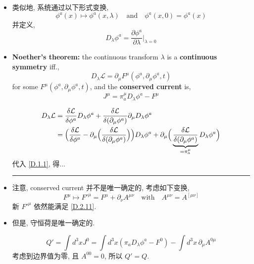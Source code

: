 \begin{itemize}
	\item 类似地, 系统通过以下形式变换,
	\begin{equation}
		\phi^a(x) \mapsto \phi^a(x, \lambda) \quad \text{and} \quad \phi^a(x, 0) = \phi^a(x)
	\end{equation}
	并定义,
	\begin{equation}
		D_\lambda \phi^a = \frac{\partial \phi^a}{\partial \lambda} \Big|_{\lambda = 0}
	\end{equation}
	
	\item \textbf{Noether's theorem:} the continuous transform $\lambda$ is a \textbf{continuous symmetry} iff.,
	\begin{equation} \label{D.2.11}
		D_\lambda \mathcal{L} = \partial_\mu F^\mu(\phi^a, \partial_\mu \phi^a, t)
	\end{equation}
	for some $F^\mu(\phi^a, \partial_\mu \phi^a, t)$, and the \textbf{conserved current} is,
	\begin{equation} \label{D.2.12}
		J^\mu = \pi_a^\mu D_\lambda \phi^a - F^\mu
	\end{equation}
	
	\begin{tcolorbox}[title=proof:]
		\begin{align}
			D_\lambda \mathcal{L} &= \frac{\delta \mathcal{L}}{\delta \phi^a} D_\lambda \phi^a + \frac{\delta \mathcal{L}}{\delta (\partial_\mu \phi^a)} \partial_\mu D_\lambda \phi^a \notag \\
			&= \Big( \frac{\delta \mathcal{L}}{\delta \phi^a} - \partial_\mu \Big( \frac{\delta \mathcal{L}}{\delta (\partial_\mu \phi^a)} \Big) \Big) D_\lambda \phi^a + \partial_\mu \Big( \underbrace{\frac{\delta \mathcal{L}}{\delta (\partial_\mu \phi^a)}}_{= \pi_a^\mu} D_\lambda \phi^a \Big)
		\end{align}
		代入 \eqref{D.1.1}, 得...
	\end{tcolorbox}
	
	\noindent\rule[0.5ex]{\linewidth}{0.5pt} %
	
	\item 注意, conserved current 并不是唯一确定的, 考虑如下变换,
	\begin{equation}
		F^\mu \mapsto F'^\mu = F^\mu + \partial_\nu A^{\mu \nu} \quad \text{with} \quad A^{\mu \nu} = A^{[\mu \nu]}
	\end{equation}
	新 $F'^\mu$ 依然能满足 \eqref{D.2.11}.
	
	\item 但是, 守恒荷是唯一确定的.
	
	\begin{tcolorbox}[title=proof:]
		\begin{equation}
			Q' = \int d^3 x J^0 = \int d^3 x (\pi_a D_\lambda \phi^a - F^0) - \int d^3 x \, \partial_\mu A^{0 \mu}
		\end{equation}
		考虑到边界值为零, 且 $A^{0 0} = 0$, 所以 $Q' = Q$.
	\end{tcolorbox}
\end{itemize}

